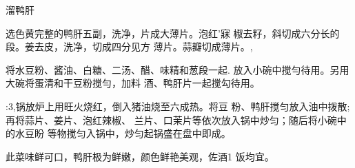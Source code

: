 \begin{recipe}{溜鸭肝}

\ingredients


\cooking

\step 	选色黄完整的鸭肝五副，洗净，片成大薄片。泡红’寐 椒去籽，斜切成六分长的段。姜去皮，洗净，切成四分见方 薄片。蒜瓣切成薄片。,

\step 	将水豆粉、酱油、白糖、二汤、醋、味精和葱段一起. 放入小碗中搅勻待用。另用大碗将蛋清和干豆粉搅勻，加料 酒、鸭肝片一起搅勾待用。

:3,锅放炉上用旺火烧红，倒入猪油烧至六成热。将豆 粉、鸭肝搅匀放入油中拨散;再将蒜片、姜片、泡红辣椒、 兰片、口茉片等依次放入锅中炒匀；随后将小碗中的水豆盼 等物搅匀入锅中，炒匀起锅盛在盘中即成。

\notes

此菜味鲜可口，鸭肝极为鲜嫩，颜色鲜艳美观，佐酒1 饭均宜。

\end{recipe}


